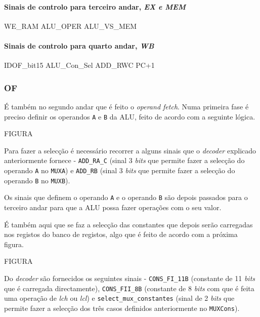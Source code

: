 \documentclass[11pt]{article}
\numberwithin{equation}{section}
\begin{document}
\paragraph{Sinais de controlo para terceiro andar, \textit{EX e MEM}}
WE\_RAM ALU\_OPER ALU\_VS\_MEM 
\paragraph{Sinais de controlo para quarto andar, \textit{WB}}
	IDOF\_bit15 ALU\_Con\_Sel ADD\_RWC PC+1







\subsubsection{OF}

É também no segundo andar que é feito o \textit{operand fetch}. Numa primeira fase é preciso definir os operandos \texttt{A} e \texttt{B} da ALU, feito de acordo com a seguinte lógica.

FIGURA 

Para fazer a selecção é necessário recorrer a alguns sinais que o \textit{decoder} explicado anteriormente fornece - \texttt{ADD\_RA\_C} (sinal 3 \textit{bits} que permite fazer a selecção do operando \texttt{A} no \texttt{MUXA}) e \texttt{ADD\_RB} (sinal 3 \textit{bits} que permite fazer a selecção do operando \texttt{B} no \texttt{MUXB}). 


Os sinais que definem o operando \texttt{A} e o operando \texttt{B} são depois passados para o terceiro andar para que a ALU possa fazer operações com o seu valor.

É também aqui que se faz a selecção das constantes que depois serão carregadas nos registos do banco de registos, algo que é feito de acordo com a próxima figura.

FIGURA

Do \textit{decoder} são fornecidos os seguintes sinais - \texttt{CONS\_FI\_11B} (constante de 11 \textit{bits} que é carregada directamente), \texttt{CONS\_FII\_8B} (constante de 8 \textit{bits} com que é feita uma operação de \textit{lch} ou \textit{lcl}) e \texttt{select\_mux\_constantes}  (sinal de 2 \textit{bits} que permite fazer a selecção dos três casos definidos anteriormente no \texttt{MUXCons}).
\end{document}
